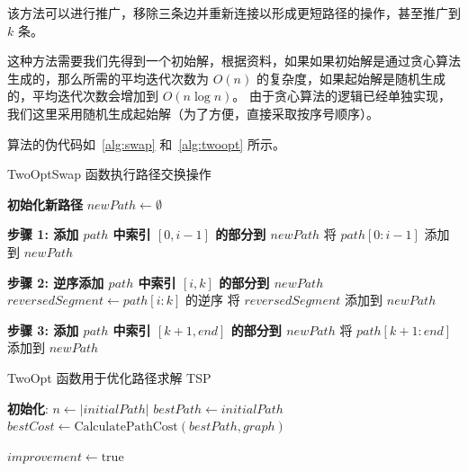 该方法可以进行推广，移除三条边并重新连接以形成更短路径的操作，甚至推广到 $k$ 条。

这种方法需要我们先得到一个初始解，根据资料，如果如果初始解是通过贪心算法生成的，那么所需的平均迭代次数为 $O(n)$ 的复杂度，如果起始解是随机生成的，平均迭代次数会增加到 $O(n\log n)$。\cite{johnson1997traveling} 由于贪心算法的逻辑已经单独实现，我们这里采用随机生成起始解（为了方便，直接采取按序号顺序）。

算法的伪代码如~\autoref{alg:swap} 和~\autoref{alg:twoopt} 所示。
\begin{algorithm}[htbp]
    \SetAlgoLined
    \caption{TwoOptSwap 函数执行路径交换操作}
    \label{alg:swap}
    \BlankLine
    
    \textbf{初始化新路径} $newPath \leftarrow \emptyset$\;
    
    \textbf{步骤 1: 添加 $path$ 中索引 $[0, i-1]$ 的部分到 $newPath$}\;
    将 $path[0:i-1]$ 添加到 $newPath$\;
    
    \textbf{步骤 2: 逆序添加 $path$ 中索引 $[i, k]$ 的部分到 $newPath$}\;
    $reversedSegment \leftarrow path[i:k]$ 的逆序\;
    将 $reversedSegment$ 添加到 $newPath$\;
    
    \textbf{步骤 3: 添加 $path$ 中索引 $[k+1, end]$ 的部分到 $newPath$}\;
    将 $path[k+1:end]$ 添加到 $newPath$\;
    
    \;
    
\end{algorithm}

\begin{algorithm}[htbp]
    \SetAlgoLined
    \caption{TwoOpt 函数用于优化路径求解 TSP}
    \label{alg:twoopt}
    \BlankLine
    
    \textbf{初始化}:
    $n \leftarrow |initialPath|$\;
    $bestPath \leftarrow initialPath$\;
    $bestCost \leftarrow \text{CalculatePathCost}(bestPath, graph)$\;
    
    $improvement \leftarrow \text{true}$\;
    
    
    \;
    
\end{algorithm}

